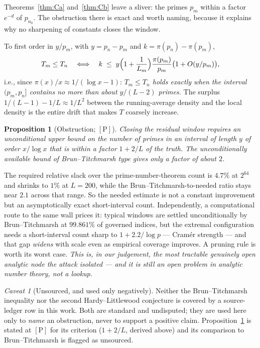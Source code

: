 \documentclass[11pt,a4paper]{article}
\theoremstyle{plain}
\newtheorem{proposition}[theorem]{Proposition}
\theoremstyle{definition}
\theoremstyle{remark}
\newtheorem{hazard}[theorem]{Caveat}
\newcommand{\cP}{{[\mathrm{P}]}}
\begin{document}
Theorems~\ref{thm:Ca} and~\ref{thm:Cb} leave a sliver: the primes $p_m$ within a factor
$e^{-d}$ of $p_{n_0}$. The obstruction there is exact and worth naming, because it explains why
no sharpening of constants closes the window.

To first order in $y/p_m$, with $y = p_n - p_m$ and $k = \pi(p_n) - \pi(p_m)$,
\[
T_m \le T_n
\quad\Longleftrightarrow\quad
k \;\le\; y\Bigl(1 + \frac{1}{L_m}\Bigr)\frac{\pi(p_m)}{p_m}\bigl(1 + O(y/p_m)\bigr) ,
\]
i.e., since $\pi(x)/x \approx 1/(\log x - 1)$: \emph{$T_m \le T_n$ holds exactly when the
interval $(p_m, p_n]$ contains no more than about $y/(L-2)$ primes.} The surplus
$1/(L-1) - 1/L \approx 1/L^2$ between the running-average density and the local density is
the entire drift that makes $T$ coarsely increase.

\begin{proposition}[Obstruction; $\cP$]
\label{prop:obstruction}
Closing the residual window requires an unconditional upper bound on the number of primes in
an interval of length $y$ of order $x/\log x$ that is within a factor $1 + 2/L$ of the truth.
The unconditionally available bound of Brun--Titchmarsh type gives only a factor of about $2$.
\end{proposition}

The required relative slack over the prime-number-theorem count is $4.7\%$ at $2^{64}$ and
shrinks to $1\%$ at $L = 200$, while the Brun--Titchmarsh-to-needed ratio stays near $2.1$
across that range. So the needed estimate is not a constant improvement but an
asymptotically exact short-interval count. Independently, a computational route to the same
wall prices it: typical windows are settled unconditionally by Brun--Titchmarsh at $99.861\%$
of governed indices, but the extremal configuration needs a short-interval count sharp to
$1 + 2.2/\log p$ --- Cram\'er strength --- and that gap \emph{widens} with scale even as
empirical coverage improves. A pruning rule is worth its worst case. \emph{This is, in our
judgement, the most tractable genuinely open analytic node the attack isolated --- and it is
still an open problem in analytic number theory, not a lookup.}

\begin{hazard}[Unsourced, and used only negatively]
\label{haz:bt}
Neither the Brun--Titchmarsh inequality nor the second Hardy--Littlewood conjecture is
covered by a source-ledger row in this work. Both are standard and undisputed; they are used
here only to \emph{name} an obstruction, never to support a positive claim.
Proposition~\ref{prop:obstruction} is stated at $\cP$ for its criterion
($1+2/L$, derived above) and its comparison to Brun--Titchmarsh is flagged as unsourced.
\end{hazard}
\end{document}
